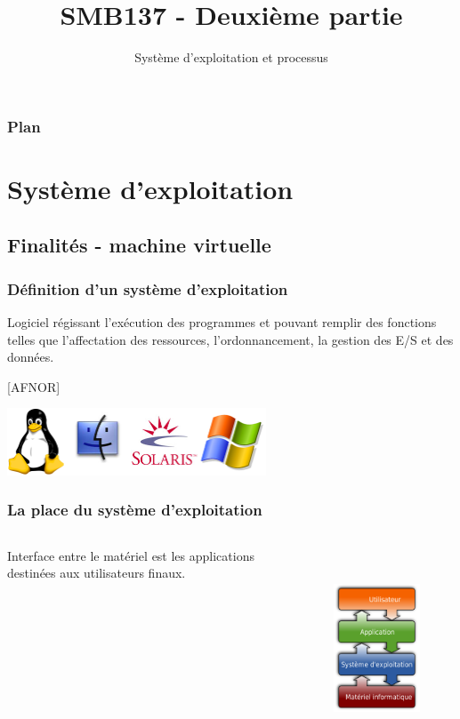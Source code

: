 

\title{SMB137 - Deuxième partie}
\subtitle{Système d'exploitation et processus}



\frame[plain]{\titlepage}

\begin{frame}
 \frametitle{Plan}
 \tableofcontents
\end{frame}


\section{Système d’exploitation}

\subsection{Finalités - machine virtuelle}
\begin{frame}
\frametitle{Définition d'un système d'exploitation}
\begin{definition}
Logiciel régissant l’exécution des programmes et pouvant remplir des
fonctions telles que l’affectation des ressources, l’ordonnancement,
la gestion des E/S et des données.

[AFNOR]
\end{definition}
\begin{center}
\includegraphics[height=2cm]{../illustration/Exemples_OS.png}
\end{center}
\end{frame}


\begin{frame}
\frametitle{La place du système d'exploitation}
\begin{columns}
Interface entre le matériel est les applications destinées aux utilisateurs finaux. \cite{wp-os}
\begin{figure}
\includegraphics[height=6cm]{../illustration/OS_placement.png}
\end{figure}
\end{columns}
\end{frame}


